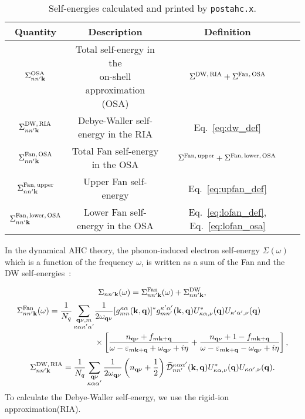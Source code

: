 \documentclass[12pt,a4paper]{article}
\newcommand{\mb}[1]{\mathbf{#1}}
\newcommand{\mkq}[0]{{m\mathbf{k}+\mathbf{q}}}
\newcommand{\qnu}[0]{{\mathbf{q}\nu}}
\newcommand{\veps}[0]{\varepsilon}
\newcommand{\dtilde}[0]{{\widetilde{\mathcal{D}}}}
\begin{document}
\begin{table}[]
\centering
\begin{tabular}{|c|c|c|c|}
\hline
Quantity & Description & Definition \\ \hline
$\Sigma_{nn'\mb{k}}^{\rm OSA}$
& \shortstack{Total self-energy in the\\ on-shell approximation (OSA)}
& $\Sigma^{\rm DW,\,RIA} + \Sigma^{\rm Fan,\,OSA}$ \\ \hline
$\Sigma^{\rm DW,\,RIA}_{nn'\mb{k}}$ & Debye-Waller self-energy in the RIA
& Eq.~\eqref{eq:dw_def} \\ \hline
$\Sigma^{\rm Fan,\,OSA}_{nn'\mb{k}}$ & Total Fan self-energy in the OSA
& $\Sigma^{\rm Fan,\,upper} + \Sigma^{\rm Fan,\,lower,\,OSA}$ \\ \hline
$\Sigma^{\rm Fan,\,upper}_{nn'\mb{k}}$ & Upper Fan self-energy
& Eq.~\eqref{eq:upfan_def} \\ \hline
$\Sigma^{\rm Fan,\,lower,\,OSA}_{nn'\mb{k}}$ & Lower Fan self-energy in the OSA
& Eq.~\eqref{eq:lofan_def}, Eq.~\eqref{eq:lofan_osa} \\ \hline
\end{tabular}
\caption{Self-energies calculated and printed by \texttt{postahc.x}.}
\end{table}

In the dynamical AHC theory, the phonon-induced electron
self-energy $\Sigma(\omega)$ which is a function of the frequency $\omega$, is
written as a sum of the Fan and the DW self-energies~\cite{2017GiustinoRMP}:

\begin{equation} \label{eq:sigma_def}
    \Sigma_{nn'\mb{k}}(\omega)
    = \Sigma^{\rm Fan}_{nn'\mb{k}} (\omega) + \Sigma^{\rm DW}_{nn'\mb{k}},
\end{equation}
\begin{align} \label{eq:fan_def}
    \Sigma^{\rm Fan}_{nn'\mb{k}} (\omega)
    = \frac{1}{N_q}\sum_{\substack{\qnu,m \\ \kappa\alpha\kappa'\alpha'}}
    &\frac{1}{2\omega_{\qnu}}
    [g_{mn}^{\kappa\alpha}(\mb{k},\mb{q})]^*
    g_{mn'}^{\kappa'\alpha'}(\mb{k},\mb{q})
    U^*_{\kappa\alpha,\nu}(\mb{q}) U_{\kappa'\alpha',\nu}(\mb{q}) \nonumber \\
    &\times \left[
    \frac{n_\qnu + f_\mkq}{\omega - \veps_\mkq + \omega_\qnu + i\eta}
    + \frac{n_\qnu + 1 - f_\mkq}{\omega - \veps_\mkq - \omega_\qnu + i\eta}
    \right],
\end{align}
\begin{equation} \label{eq:dw_def}
    \Sigma^{\rm DW,\,RIA}_{nn'\mb{k}}
    = \frac{1}{N_q}\sum_{\substack{\qnu \\ \kappa\alpha\alpha'}}
    \frac{1}{2\omega_{\qnu}} \left(n_\qnu + \frac{1}{2} \right)
    \dtilde_{nn'}^{\kappa\alpha\alpha'}(\mb{k},\mb{q})
    U_{\kappa\alpha,\nu}^*(\mb{q}) U_{\kappa\alpha',\nu}(\mb{q}).
\end{equation}
To calculate the Debye-Waller self-energy, we use the
rigid-ion approximation(RIA).
\end{document}
